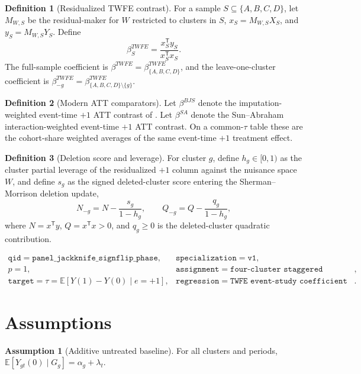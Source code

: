 \documentclass[11pt]{article}
\newcommand{\E}{\mathbb{E}}
\newcommand{\transpose}{\mathsf{T}}
\theoremstyle{definition}
\newtheorem{definition}{Definition}
\newtheorem{assumption}{Assumption}
\theoremstyle{plain}
\theoremstyle{remark}
\begin{document}
\begin{definition}[Residualized TWFE contrast]
For a sample \(S\subseteq\{A,B,C,D\}\), let \(M_{W,S}\) be the residual-maker for \(W\) restricted to clusters in \(S\), \(x_S=M_{W,S}X_S\), and \(y_S=M_{W,S}Y_S\).  Define
\[
\beta^{TWFE}_{S}=\frac{x_S^\transpose y_S}{x_S^\transpose x_S}.
\]
The full-sample coefficient is \(\beta^{TWFE}=\beta^{TWFE}_{\{A,B,C,D\}}\), and the leave-one-cluster coefficient is \(\beta^{TWFE}_{-g}=\beta^{TWFE}_{\{A,B,C,D\}\setminus\{g\}}\).
\end{definition}

\begin{definition}[Modern ATT comparators]
Let \(\beta^{BJS}\) denote the imputation-weighted event-time \(+1\) ATT contrast of \citet{borusyak_jaravel_spiess_2024_restud}.  Let \(\beta^{SA}\) denote the Sun--Abraham interaction-weighted event-time \(+1\) ATT contrast.  On a common-\(\tau\) table these are the cohort-share weighted averages of the same event-time \(+1\) treatment effect.
\end{definition}

\begin{definition}[Deletion score and leverage]
For cluster \(g\), define \(h_g\in[0,1)\) as the cluster partial leverage of the residualized \(+1\) column against the nuisance space \(W\), and define \(s_g\) as the signed deleted-cluster score entering the Sherman--Morrison deletion update,
\[
N_{-g}=N-\frac{s_g}{1-h_g},\qquad
Q_{-g}=Q-\frac{q_g}{1-h_g},
\]
where \(N=x^\transpose y\), \(Q=x^\transpose x>0\), and \(q_g\ge 0\) is the deleted-cluster quadratic contribution.
\end{definition}

\[
\begin{array}{ll}
\texttt{qid}=\texttt{panel\_jackknife\_signflip\_phase},&
\texttt{specialization}=\texttt{v1},\\
p=1,&
\texttt{assignment}=\texttt{four-cluster staggered adoption},\\
\texttt{target}=\tau=\E[Y(1)-Y(0)\mid e=+1],&
\texttt{regression}=\texttt{TWFE event-study coefficient with cluster leave-one-out refit}.
\end{array}
\]

\section{Assumptions}
\begin{assumption}[Additive untreated baseline]\label{ass:additive-baseline}
For all clusters and periods, \(\E[Y_{gt}(0)\mid G_g]=\alpha_g+\lambda_t\).
\end{assumption}
\end{document}

